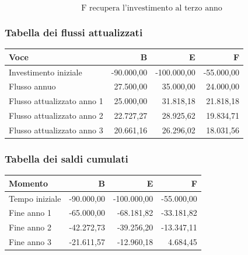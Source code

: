 \[
\boxed{
\text{F recupera l'investimento al terzo anno}
}
\]


\subsubsection*{Tabella dei flussi attualizzati}

\begin{center}
    \small
    \begin{tabular}{|l|r|r|r|}
        \hline
        \textbf{Voce}
        & \textbf{B}
        & \textbf{E}
        & \textbf{F} \\
        \hline
        Investimento iniziale
        & -90.000,00 & -100.000,00 & -55.000,00 \\
        \hline
        Flusso annuo
        & 27.500,00 & 35.000,00 & 24.000,00 \\
        \hline
        Flusso attualizzato anno 1
        & 25.000,00 & 31.818,18 & 21.818,18 \\
        \hline
        Flusso attualizzato anno 2
        & 22.727,27 & 28.925,62 & 19.834,71 \\
        \hline
        Flusso attualizzato anno 3
        & 20.661,16 & 26.296,02 & 18.031,56 \\
        \hline
    \end{tabular}
\end{center}


\subsubsection*{Tabella dei saldi cumulati}

\begin{center}
    \small
    \begin{tabular}{|l|r|r|r|}
        \hline
        \textbf{Momento}
        & \textbf{B}
        & \textbf{E}
        & \textbf{F} \\
        \hline
        Tempo iniziale
        & -90.000,00 & -100.000,00 & -55.000,00 \\
        \hline
        Fine anno 1
        & -65.000,00 & -68.181,82 & -33.181,82 \\
        \hline
        Fine anno 2
        & -42.272,73 & -39.256,20 & -13.347,11 \\
        \hline
        Fine anno 3
        & -21.611,57 & -12.960,18 & 4.684,45 \\
        \hline
    \end{tabular}
\end{center}

